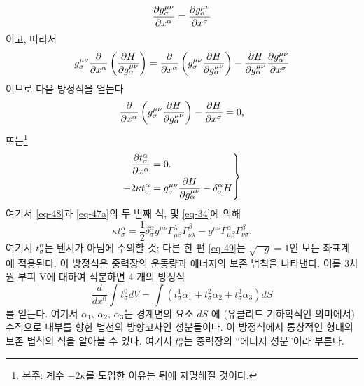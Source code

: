 \documentclass[b5paper]{article}
\begin{document}
\begin{equation*}
	{\frac{{\partial}{g_\sigma^{\mu\nu}}}{{\partial}{x^\alpha}}}={\frac{{\partial}{g_\alpha^{\mu\nu}}}{{\partial}{x^\sigma}}}
\end{equation*}
이고, 따라서
\begin{equation*}
	g_\sigma^{\mu\nu} {\frac{{\partial}{}}{{\partial}{x^\alpha}}}\left({\frac{{\partial}{H}}{{\partial}{g_\alpha^{\mu\nu}}}}\right)
	= {\frac{{\partial}{}}{{\partial}{x^\alpha}}}\left(g_\sigma^{\mu\nu} {\frac{{\partial}{H}}{{\partial}{g_\alpha^{\mu\nu}}}}\right)
	- {\frac{{\partial}{H}}{{\partial}{g_\alpha^{\mu\nu}}}} {\frac{{\partial}{g_\alpha^{\mu\nu}}}{{\partial}{x^\sigma}}}
\end{equation*}
이므로 다음 방정식을 얻는다
\begin{equation*}
	{\frac{{\partial}{}}{{\partial}{x^\alpha}}}\left(g_\sigma^{\mu\nu} {\frac{{\partial}{H}}{{\partial}{g_\alpha^{\mu\nu}}}}\right)
	- {\frac{{\partial}{H}}{{\partial}{x^\sigma}}} = 0,
\end{equation*}
또는\footnote{본주: 계수 $-2\kappa$를 도입한 이유는 뒤에 자명해질 것이다.}
\begin{equation} \label{eq-49}
\left.
	\begin{aligned}
	{\frac{{\partial}{t_\sigma^\alpha}}{{\partial}{x^\alpha}}}&=0.\\
	-2\kappa t_\sigma^\alpha &= g_\sigma^{\mu\nu} {\frac{{\partial}{H}}{{\partial}{g_\alpha^{\mu\nu}}}}-\delta_\sigma^\alpha H
	\end{aligned}
\right\}
\end{equation}
여기서 \eqref{eq-48}과 \eqref{eq-47a}의 두 번째 식, 및 \eqref{eq-34}에 의해
\begin{equation} \label{eq-50}
	\kappa t_\sigma^\alpha
	= \frac{1}{2}\delta_\sigma^\alpha g^{\mu\nu} \Gamma_{\mu\beta}^\lambda \Gamma_{\nu\lambda}^\beta
	- g^{\mu\nu} \Gamma_{\mu\beta}^\alpha \Gamma_{\nu\sigma}^\beta .
\end{equation}
여기서 $t_\sigma^\alpha$는 텐서가 아님에 주의할 것; 다른 한 편 \eqref{eq-49}는 $\sqrt{-g}=1$인 모든 좌표계에 적용된다. 이 방정식은 중력장의 운동량과 에너지의 보존 법칙을 나타낸다. 이를 3차원 부피 V에 대하여 적분하면 4 개의 방정식
\begin{equation} \tag{49a} \label{eq-49a}
	\frac{d}{dx^0}\int t_\sigma^0 dV = \int(t_\sigma^1 \alpha_1 + t_\sigma^2 \alpha_2 + t_\sigma^3 \alpha_3)dS
\end{equation}
를 얻는다. 여기서 $\alpha_1$, $\alpha_2$, $\alpha_3$는 경계면의 요소 $dS$ 에 (유클리드 기하학적인 의미에서) 수직으로 내부를 향한 법선의 방향코사인 성분들이다.
이 방정식에서 통상적인 형태의 보존 법칙의 식을 알아볼 수 있다. 여기서 $t_\sigma^\alpha$는 중력장의 ``에너지 성분''이라 부른다.
\end{document}

